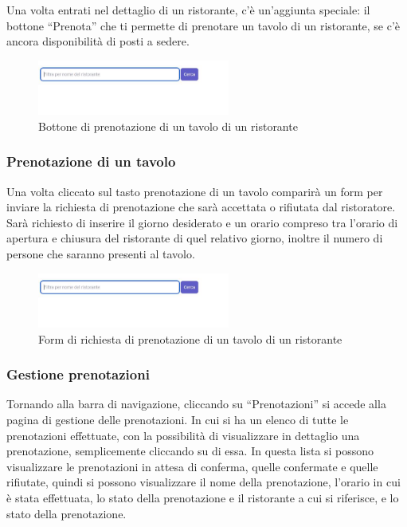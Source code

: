 Una volta entrati nel dettaglio di un ristorante, c'è un'aggiunta speciale: il bottone ``Prenota'' che ti permette di prenotare un tavolo di un ristorante, 
se c'è ancora disponibilità di posti a sedere.

\begin{figure}[htbp]
    \centering
    \includegraphics[width=0.5625\textwidth]{./img/Dettaglio.jpg}
    \caption{Bottone di prenotazione di un tavolo di un ristorante}
\end{figure}

\subsubsection{Prenotazione di un tavolo}
Una volta cliccato sul tasto prenotazione di un tavolo comparirà un form per inviare la richiesta di prenotazione che sarà accettata o rifiutata dal ristoratore.
Sarà richiesto di inserire il giorno desiderato e un orario compreso tra l'orario di apertura e chiusura del ristorante di quel relativo giorno, inoltre il numero 
di persone che saranno presenti al tavolo.

\begin{figure}[htbp]
    \centering
    \includegraphics[width=0.5625\textwidth]{./img/Dettaglio.jpg}
    \caption{Form di richiesta di prenotazione di un tavolo di un ristorante}
\end{figure}

\subsubsection{Gestione prenotazioni}
Tornando alla barra di navigazione, cliccando su ``Prenotazioni'' si accede alla pagina di gestione delle prenotazioni.
In cui si ha un elenco di tutte le prenotazioni effettuate, con la possibilità di visualizzare in dettaglio una prenotazione, semplicemente cliccando su di essa.
In questa lista si possono visualizzare le prenotazioni in attesa di conferma, quelle confermate e quelle rifiutate, quindi si possono visualizzare il nome della 
prenotazione, l'orario in cui è stata effettuata, lo stato della prenotazione e il ristorante a cui si riferisce, e lo stato della prenotazione.

